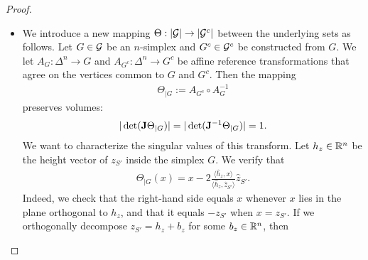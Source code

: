 \documentclass[10pt,a4paper]{article}
\begin{document}
\begin{proof}
\begin{itemize}
        \item 
        We introduce a new mapping $\Theta : \left| {\mathcal G} \right| \rightarrow \left| {\mathcal G}^c \right|$ between the underlying sets as follows.
        Let $G \in {\mathcal G}$ be an $n$-simplex and $G^{c} \in {\mathcal G}^{c}$ be constructed from $G$.
        We let $A_{G} : \Delta^{n} \rightarrow G$ and $A_{G^{c}} : \Delta^{n} \rightarrow G^{c}$
        be affine reference transformations
        that agree on the vertices common to $G$ and $G^{c}$.
        Then the mapping 
        \begin{align*}
            \Theta_{|G} := A_{G^{c}} \circ A_{G}^{-1}
        \end{align*}
        preserves volumes:
        \begin{align*}
            |\det( {\mathbf{J}}      \Theta_{|G} )|
            = 
            |\det( {\mathbf{J}}^{-1} \Theta_{|G} )|
            =
            1
            .
        \end{align*}
        We want to characterize the singular values of this transform. 
        Let $h_{z} \in {\mathbb R}^{n}$ be the height vector of $z_{S'}$ inside the simplex $G$.
        We verify that 
        \begin{align*}
            \Theta_{|G}(x) 
            = 
            x
            - 
            2 \frac{\langle \hat h_{z}, x \rangle}{\langle \hat h_{z}, \hat z_{S'} \rangle}
            \hat z_{S'}
            .
        \end{align*}
        Indeed, we check that the right-hand side equals $x$ whenever $x$ lies in the plane orthogonal to $h_{z}$,
        and that it equals $-z_{S'}$ when $x = z_{S'}$.
        If we orthogonally decompose $z_{S'} = h_{z} + b_{z}$ for some $b_{z} \in {\mathbb R}^{n}$, then 

\end{itemize}
\end{proof}
\end{document}
